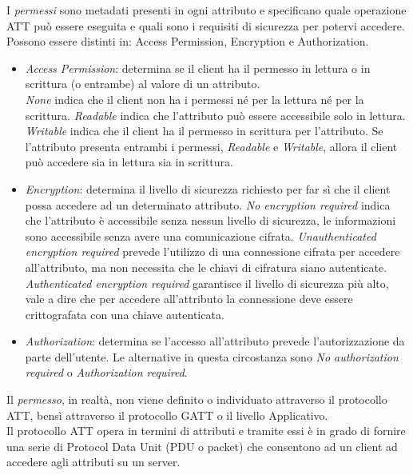 I \textit{permessi} sono metadati presenti in ogni attributo e specificano quale operazione ATT può essere eseguita e quali sono i requisiti di sicurezza per potervi accedere. Possono essere distinti in: Access Permission, Encryption e Authorization.
\begin{itemize}
    \item \textit{Access Permission}: determina se il client ha il permesso in lettura o in scrittura (o entrambe) al valore di un attributo.\\
    \textit{None} indica che il client non ha i permessi né per la lettura né per la scrittura.
    \textit{Readable} indica che l'attributo può essere accessibile solo in lettura.
    \textit{Writable} indica che il client ha il permesso in scrittura per l'attributo.
    Se l'attributo presenta entrambi i permessi, \textit{Readable} e \textit{Writable}, allora il client può accedere sia in lettura sia in scrittura.
    
    \item \textit{Encryption}: determina il livello di sicurezza richiesto per far sì che il client possa accedere ad un determinato attributo.
    \textit{No encryption required} indica che l'attributo è accessibile senza nessun livello di sicurezza, le informazioni sono accessibile senza avere una comunicazione cifrata.
    \textit{Unauthenticated encryption required} prevede l'utilizzo di una connessione cifrata per accedere all'attributo, ma non necessita che le chiavi di cifratura siano autenticate.
    \textit{Authenticated encryption required} garantisce il livello di sicurezza più alto, vale a dire che per accedere all'attributo la connessione deve essere crittografata con una chiave autenticata.
    
    \item \textit{Authorization}: determina se l'accesso all'attributo prevede l'autorizzazione da parte dell'utente. Le alternative in questa circostanza sono \textit{No authorization required} o \textit{Authorization required}.
\end{itemize}
\noindent Il \textit{permesso}, in realtà, non viene definito o individuato attraverso il protocollo ATT, bensì attraverso il protocollo GATT o il livello Applicativo.\\

\noindent Il protocollo ATT opera in termini di attributi e tramite essi è in grado di fornire una serie di Protocol Data Unit (PDU o packet) che consentono ad un client ad accedere agli attributi su un server.

